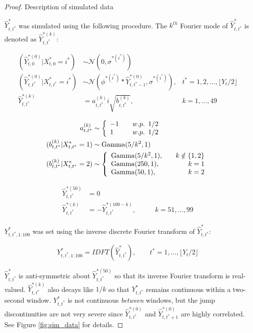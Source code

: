 \begin{proof}{Description of simulated data}{}

$\hat{Y}^*_{t,t^*}$ was simulated using the following procedure. The $k^{th}$ Fourier mode of $\hat{Y}^*_{t,t^*}$ is denoted as $\hat{Y}^{*(k)}_{t,t^*}$:

\begin{align}
	(\hat{Y}^{*(0)}_{t,0}|X^*_{t,0} = i^*) &\sim \mathcal{N} \left(0, \sigma^{*(i^*)} \right) & \nonumber \\
	(\hat{Y}^{*(0)}_{t,t^*}|X^*_{t,t^*} = i^*) &\sim \mathcal{N} \left(\phi^{*(i^*)} * \hat{Y}^{*(0)}_{t,t^*-1}, \sigma^{*(i^*)} \right), & t^* = 1,2,\ldots, \lfloor Y_t/2 \rfloor \label{eqn:y_hat0} \\
	\hat{Y}^{*(k)}_{t,t^*} &= a_{t,t^*}^{(k)} i\sqrt{b^{(k)}_{t,t^*}}, & k = 1,\ldots,49 \nonumber
\end{align}

\begin{align*}
    a_{t,t^*}^{(k)} &\sim  \left\{\begin{array}{lr}
	-1 & \quad w.p. \enspace 1/2 \\
	1  & \quad w.p. \enspace 1/2
	\end{array}\right. \\
	(b^{(k)}_{t,t^*}|X^*_{t,t^*}  = 1) &\sim {\rm{Gamma}}(5/k^2, 1) \\
	(b^{(k)}_{t,t^*}|X^*_{t,t^*} = 2) &\sim \left\{\begin{array}{lr}
	{\rm{Gamma}}(5/k^2, 1), \quad & k \notin \{1,2\} \\
	{\rm{Gamma}}(250,1), & k = 1 \\
	{\rm{Gamma}}(50,1), & k = 2
	\end{array}\right. 
\end{align*}

\begin{align*}
    \hat{Y}^{*(50)}_{t,t^*} &= 0 & \\
	\hat{Y}^{*(k)}_{t,t^*}  &= -\hat{Y}^{*(100-k)}_{t,t^*}, & \qquad k = 51,\ldots,99
\end{align*}

$Y^*_{t,t^*,1:100}$ was set using the inverse discrete Fourier transform of $\hat{Y}^*_{t,t^*}$:

$$Y^*_{t,t^*,1:100} = IDFT\left(\hat{Y}^*_{t,t^*}\right), \qquad t^* = 1,\ldots,\lfloor Y_t/2 \rfloor$$

$\hat{Y}^*_{t,t^*}$ is anti-symmetric about $\hat{Y}^{*(50)}_{t,t^*}$ so that its inverse Fourier transform is real-valued. $\hat{Y}^{*(k)}_{t,t^*}$ also decays like $1/k$ so that $Y^*_{t,t^*}$ remains continuous within a two-second window. $Y^*_{t,t^*}$ is not continuous \textit{between} windows, but the jump discontinuities are not very severe since $\hat{Y}^{*(0)}_{t,t^*}$ and $\hat{Y}^{*(0)}_{t,t^*+1}$ are highly correlated. See Figure \ref{fig:sim_data} for details. 


\end{proof}

